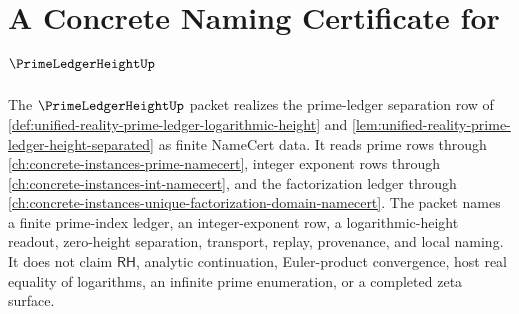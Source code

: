 \chapter{A Concrete Naming Certificate for $\PrimeLedgerHeightUp$}
\label{ch:concrete-instances-prime-ledger-height-namecert}

The $\PrimeLedgerHeightUp$ packet realizes the prime-ledger separation row of \autoref{def:unified-reality-prime-ledger-logarithmic-height} and \autoref{lem:unified-reality-prime-ledger-height-separated} as finite NameCert data. It reads prime rows through \autoref{ch:concrete-instances-prime-namecert}, integer exponent rows through \autoref{ch:concrete-instances-int-namecert}, and the factorization ledger through \autoref{ch:concrete-instances-unique-factorization-domain-namecert}. The packet names a finite prime-index ledger, an integer-exponent row, a logarithmic-height readout, zero-height separation, transport, replay, provenance, and local naming. It does not claim $\mathsf{RH}$, analytic continuation, Euler-product convergence, host real equality of logarithms, an infinite prime enumeration, or a completed zeta surface.


